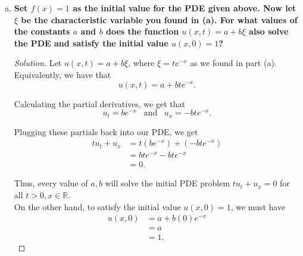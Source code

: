\documentclass[11pt]{article}
\newenvironment{solution}
  {\renewcommand\qedsymbol{$\blacksquare$}\begin{proof}[Solution]}
  {\end{proof}}
\begin{document}
\begin{enumerate}[(a)]
    \begin{solution}
      We set $f(x) = x$ as per the instructions. We will now check whether the solution $u(x, t) = f(te^{-x})$ satisfies the initial value
      \[ u(x, 0) = x \, \, \, \text{for } x \in \mathbb{R}.\]
  
      Plugging in $t=0$ to our solution $u(x, t) = f(te^{-x})$, we get that \[ u(x, 0) = f(0e^{-x}) = f(0) = 0 \text{ for } x \in \mathbb{R} \]
  
      However, notice that to satisfy the initial condition, we must have that $u(x, 0) = f(x) = x$ for $x\in \mathbb{R}$. \\
  
      Clearly, \[ u(x, 0) = 0 \neq x \text{ for } x \in \mathbb{R}, \] and so the solution we found in (a) does not satisfy the initial value for the PDE.
      \end{solution}
    
    \item \textbf{Set $f(x) = 1$ as the initial value for the PDE given above. Now let $\xi$ be the characteristic variable you found in (a). 
    For what values of the constants $a$ and $b$ does the function $u(x, t) = a + b\xi$ also solve the PDE and satisfy the initial value $u(x,0) = 1$?}
    
    \begin{solution}
    Let $u(x, t) = a + b\xi$, where $\xi = te^{-x}$ as we found in part (a). Equivalently, we have that
    \[ u(x, t) = a + bte^{-x}.\]

    Calculating the partial derivatives, we get that \[ u_t = be^{-x} \,\,\, \text { and } \,\,\, u_x = -bte^{-x}.\]

    Plugging these partials back into our PDE, we get
    \begin{align*} tu_t + u_x &= t\left(be^{-x}\right) + \left(-bte^{-x}\right) \\
      &= bte^{-x}  - bte^{-x} \\
      &= 0.
    \end{align*}

    Thus, every value of $a, b$ will solve the initial PDE problem $tu_t + u_x = 0$ for all $t  > 0, x \in \mathbb{R}$. \\

    On the other hand, to satisfy the initial value $u(x, 0) = 1$, we must have
    \begin{align*} u(x, 0) &= a + b(0)e^{-x} \\
      &= a \\
      &= 1.\end{align*}


\end{solution}
\end{enumerate}
\end{document}
